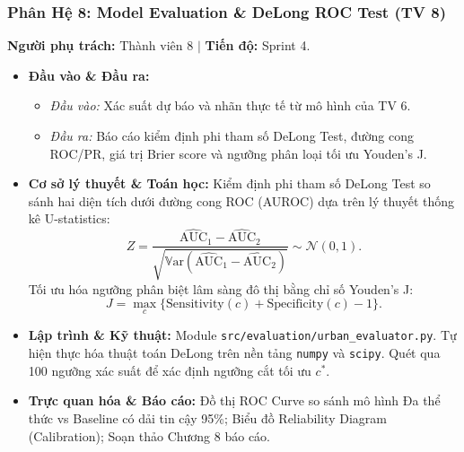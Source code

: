 \documentclass[11pt,a4paper]{article}
\begin{document}
\subsubsection{Phân Hệ 8: Model Evaluation \& DeLong ROC Test (TV 8)}
\textbf{Người phụ trách:} Thành viên 8 \quad $\vert$ \quad \textbf{Tiến độ:} Sprint 4.
\begin{itemize}[leftmargin=*]
    \item \textbf{Đầu vào \& Đầu ra:}
    \begin{itemize}
        \item \textit{Đầu vào:} Xác suất dự báo và nhãn thực tế từ mô hình của TV 6.
        \item \textit{Đầu ra:} Báo cáo kiểm định phi tham số DeLong Test, đường cong ROC/PR, giá trị Brier score và ngưỡng phân loại tối ưu Youden's J.
    \end{itemize}
    \item \textbf{Cơ sở lý thuyết \& Toán học:}
    Kiểm định phi tham số DeLong Test so sánh hai diện tích dưới đường cong ROC (AUROC) dựa trên lý thuyết thống kê U-statistics:
    \begin{equation}
        Z = \frac{\widehat{\text{AUC}}_1 - \widehat{\text{AUC}}_2}{\sqrt{\mathbb{V}\text{ar}(\widehat{\text{AUC}}_1 - \widehat{\text{AUC}}_2)}} \sim \mathcal{N}(0, 1).
    \end{equation}
    Tối ưu hóa ngưỡng phân biệt lâm sàng đô thị bằng chỉ số Youden's J:
    \begin{equation}
        J = \max_{c} \{\text{Sensitivity}(c) + \text{Specificity}(c) - 1\}.
    \end{equation}
    \item \textbf{Lập trình \& Kỹ thuật:} Module \texttt{src/evaluation/urban\_evaluator.py}. Tự hiện thực hóa thuật toán DeLong trên nền tảng \texttt{numpy} và \texttt{scipy}. Quét qua 100 ngưỡng xác suất để xác định ngưỡng cắt tối ưu $c^*$.
    \item \textbf{Trực quan hóa \& Báo cáo:} Đồ thị ROC Curve so sánh mô hình Đa thể thức vs Baseline có dải tin cậy 95\%; Biểu đồ Reliability Diagram (Calibration); Soạn thảo Chương 8 báo cáo.
\end{itemize}
\end{document}
